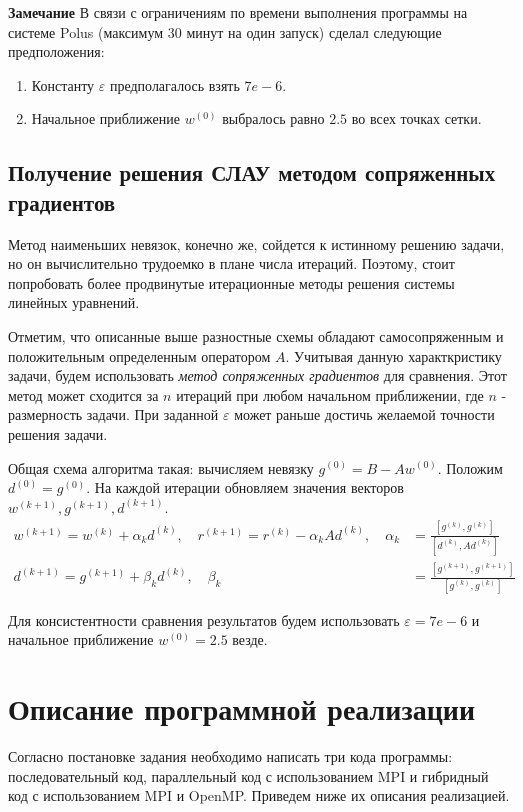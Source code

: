 \documentclass{article}
\begin{document}
\textbf{Замечание} В связи с ограничениям по времени выполнения программы на системе Polus (максимум 30 минут на один запуск) сделал следующие предположения:
\begin{enumerate}
    \item Константу $\varepsilon$ предполагалось взять $7e-6$.
    \item Начальное приближение $w^{(0)}$ выбралось равно $2.5$ во всех точках сетки.
\end{enumerate}

\subsection{Получение решения СЛАУ методом сопряженных градиентов}
Метод наименьших невязок, конечно же, сойдется к истинному решению задачи, но он вычислительно трудоемко в плане числа итераций. Поэтому, стоит попробовать более продвинутые итерационные методы решения системы линейных уравнений.

Отметим, что описанные выше разностные схемы обладают самосопряженным и положительным определенным оператором $A$. Учитывая данную характкристику задачи, будем использовать \textit{метод сопряженных градиентов} для сравнения. Этот метод может сходится за $n$ итераций при любом начальном приближении, где $n$ - размерность задачи. При заданной $\varepsilon$ может раньше достичь желаемой точности решения задачи.

Общая схема алгоритма такая: вычисляем невязку $g^{(0)} = B - Aw^{(0)}$. Положим $d^{(0)} = g^{(0)}$. На каждой итерации обновляем значения векторов $w^{(k+1)}, g^{(k+1)}, d^{(k+1)}$.
\begin{equation*}
\begin{aligned}
w^{(k+1)} = w^{(k)} + \alpha_k d^{(k)},\quad r^{(k+1)} = r^{(k)} - \alpha_k Ad^{(k)}, \quad \alpha_k &= \frac{[g^{(k)}, g^{(k)}]}{[d^{(k)}, Ad^{(k)}]}\\
d^{(k+1)} = g^{(k+1)} + \beta_k d^{(k)},\quad \beta_k &= \frac{[g^{(k+1)}, g^{(k+1)}]}{[g^{(k)}, g^{(k)}]}
\end{aligned}
\end{equation*}

Для консистентности сравнения результатов будем использовать $\varepsilon=7e-6$ и начальное приближение $w^{(0)} = 2.5$ везде.

\section{Описание программной реализации}
Согласно постановке задания необходимо написать три кода программы: последовательный код, параллельный код с использованием MPI и гибридный код с использованием MPI и OpenMP. Приведем ниже их описания реализацией.
\end{document}
